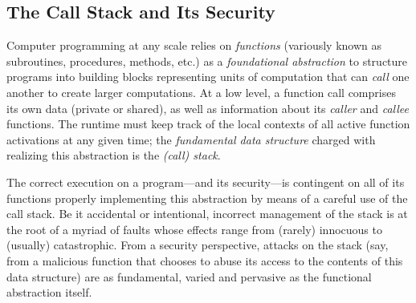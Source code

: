 \subsection{The Call Stack and Its Security}


Computer programming at any scale relies on \emph{functions} (variously known as
subroutines, procedures, methods, etc.) as a \emph{foundational abstraction} to
structure programs into building blocks representing units of computation that
can \emph{call} one another to create larger computations.
%
At a low level, a function call comprises its own data (private or shared), as
well as information about its \emph{caller} and \emph{callee} functions. The
runtime must keep track of the local contexts of all active function activations
at any given time; the \emph{fundamental data structure} charged with realizing
this abstraction is the \emph{(call) stack}.
%

The correct execution on a program---and its security---is contingent on all of
its functions properly implementing this abstraction by means of a careful use
of the call stack. Be it accidental or intentional, incorrect management of the
stack is at the root of a myriad of faults whose effects range from (rarely)
innocuous to (usually) catastrophic.
%
From a security perspective, attacks on the stack (say, from a malicious
function that chooses to abuse its access to the contents of this data
structure) are as fundamental, varied and pervasive as the functional
abstraction itself.
%


